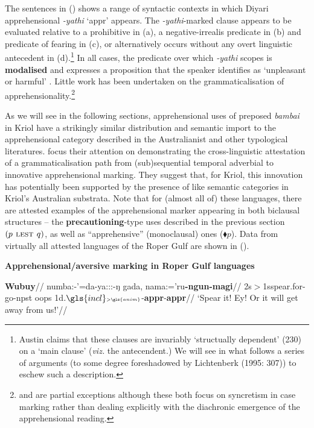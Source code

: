 The sentences in (\lastx) shows a range of syntactic contexts in which Diyari apprehensional \textit{-yathi} `{\sc appr}' appears. The \textit{-yathi}-marked clause appears to be evaluated relative to a prohibitive in (a), a negative-irrealis predicate in (b) and predicate of fearing in (c), or alternatively occurs without any overt linguistic antecedent in (d).\footnote{Austin claims that these clauses are invariably `structually dependent' (230) on a `main clause' (\textit{viz.} the antecendent.) We will see in what follows a series of arguments (to some degree foreshadowed by Lichtenberk (1995: 307)) to eschew such a description.} In all cases, the predicate over which \textit{-yathi} scopes is \textbf{modalised} and expresses a proposition that the speaker identifies as `unpleasant or harmful' \citep[227]{Austin2011}. Little work has been undertaken on the grammaticalisation of apprehensionality.\footnote{\citet[171]{Dixon2002a} and \citet[44]{Blake1993} are partial exceptions although these both focus on syncretism in case marking rather than dealing explicitly with the diachronic emergence of the apprehensional reading.}

As we will see in the following sections, apprehensional uses of preposed \textit{bambai} in Kriol have a strikingly similar distribution and semantic import to the apprehensional category described in the Australianist and other typological literatures. \citet{Angelo2016} focus their attention on demonstrating the cross-linguistic attestation of a grammaticalisation path from (sub)sequential temporal adverbial to innovative apprehensional marking. They suggest that, for Kriol, this innovation has potentially been supported by the presence of like semantic categories in Kriol's Australian substrata. Note that for (almost all of) these languages, there are attested examples of the apprehensional marker appearing in both biclausal structures -- the \textbf{precautioning}-type uses described in the previous section $ (p \textsc{ lest } q) $, as well as ``apprehensive'' (monoclausal) ones (\textit{$\blacklozenge p$}). Data from virtually all attested languages of the Roper Gulf are shown in (\nextx).

\pex \textbf{Apprehensional/aversive marking in Roper Gulf languages}



\a\begingl\glpreamble\textbf{Wubuy}//
\gla numba:-'=da-ya:::-ŋ gada, nama:='ru\textbf{-ngun-magi}//
\glb 2s$\scriptscriptstyle>$1s\textdblhyphen{}spear.for-go-\gls{npst} oops 1d$.\gls{incl}\scriptscriptstyle>\gls{anim}$-\textbf{\gls{appr}}-\textbf{\gls{appr}}//
\glft`Spear it! Ey! Or it will get away from us!'//
\endgl



